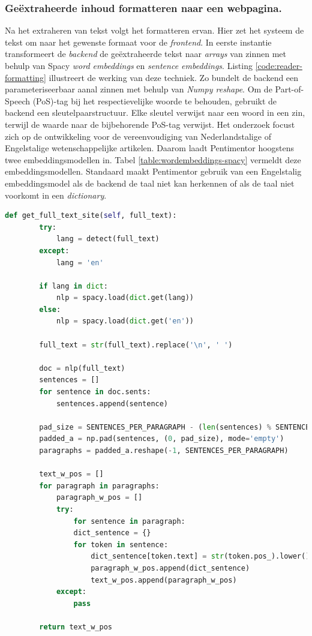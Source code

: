 \subsubsection{Geëxtraheerde inhoud formatteren naar een webpagina.}

Na het extraheren van tekst volgt het formatteren ervan. Hier zet het systeem de tekst om naar het gewenste formaat voor de \textit{frontend}. In eerste instantie transformeert de \textit{backend} de geëxtraheerde tekst naar \textit{arrays} van zinnen met behulp van Spacy \textit{word embeddings} en \textit{sentence embeddings}. Listing \ref{code:reader-formatting} illustreert de werking van deze techniek. Zo bundelt de backend een parameteriseerbaar aanal zinnen met behulp van \textit{Numpy reshape}. Om de Part-of-Speech (PoS)-tag bij het respectievelijke woorde te behouden, gebruikt de backend een sleutelpaarstructuur. Elke sleutel verwijst naar een woord in een zin, terwijl de waarde naar de bijbehorende PoS-tag verwijst. Het onderzoek focust zich op de ontwikkeling voor de vereenvoudiging van Nederlandstalige of Engelstalige wetenschappelijke artikelen. Daarom laadt Pentimentor hoogstens twee embeddingsmodellen in. Tabel \ref{table:wordembeddings-spacy} vermeldt deze embeddingsmodellen. Standaard maakt Pentimentor gebruik van een Engelstalig embeddingsmodel als de backend de taal niet kan herkennen of als de taal niet voorkomt in een \textit{dictionary}. 

\begin{lstlisting}[language=Python, caption={Het formatteren van de tekst naar een formaat voor de website.}, label={code:reader-formatting}]
	def get_full_text_site(self, full_text):
		try:
			lang = detect(full_text)
		except:
			lang = 'en'
		
		if lang in dict:
			nlp = spacy.load(dict.get(lang))
		else:
			nlp = spacy.load(dict.get('en'))
		
		full_text = str(full_text).replace('\n', ' ')
		
		doc = nlp(full_text)
		sentences = []
		for sentence in doc.sents:
			sentences.append(sentence)
		
		pad_size = SENTENCES_PER_PARAGRAPH - (len(sentences) % SENTENCES_PER_PARAGRAPH)
		padded_a = np.pad(sentences, (0, pad_size), mode='empty')
		paragraphs = padded_a.reshape(-1, SENTENCES_PER_PARAGRAPH)
		
		text_w_pos = []
		for paragraph in paragraphs:
			paragraph_w_pos = []
			try:
				for sentence in paragraph:
				dict_sentence = {}
				for token in sentence:
					dict_sentence[token.text] = str(token.pos_).lower()
					paragraph_w_pos.append(dict_sentence)    
					text_w_pos.append(paragraph_w_pos)
			except:
				pass
				
		return text_w_pos
\end{lstlisting}


